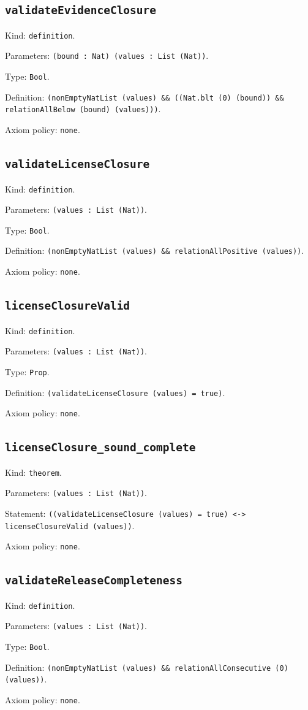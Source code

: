 \documentclass[11pt]{article}
\begin{document}
\subsection*{\texttt{validateEvidenceClosure}}
\noindent Kind: \texttt{definition}.\par
\noindent Parameters: \texttt{(bound : Nat) (values : List (Nat))}.\par
\noindent Type: \texttt{Bool}.\par
\noindent Definition: \texttt{(nonEmptyNatList (values) \&\& ((Nat.blt (0) (bound)) \&\& relationAllBelow (bound) (values)))}.\par
\noindent Axiom policy: \texttt{none}.\par
\subsection*{\texttt{validateLicenseClosure}}
\noindent Kind: \texttt{definition}.\par
\noindent Parameters: \texttt{(values : List (Nat))}.\par
\noindent Type: \texttt{Bool}.\par
\noindent Definition: \texttt{(nonEmptyNatList (values) \&\& relationAllPositive (values))}.\par
\noindent Axiom policy: \texttt{none}.\par
\subsection*{\texttt{licenseClosureValid}}
\noindent Kind: \texttt{definition}.\par
\noindent Parameters: \texttt{(values : List (Nat))}.\par
\noindent Type: \texttt{Prop}.\par
\noindent Definition: \texttt{(validateLicenseClosure (values) = true)}.\par
\noindent Axiom policy: \texttt{none}.\par
\subsection*{\texttt{licenseClosure\_sound\_complete}}
\noindent Kind: \texttt{theorem}.\par
\noindent Parameters: \texttt{(values : List (Nat))}.\par
\noindent Statement: \texttt{((validateLicenseClosure (values) = true) <-> licenseClosureValid (values))}.\par
\noindent Axiom policy: \texttt{none}.\par
\subsection*{\texttt{validateReleaseCompleteness}}
\noindent Kind: \texttt{definition}.\par
\noindent Parameters: \texttt{(values : List (Nat))}.\par
\noindent Type: \texttt{Bool}.\par
\noindent Definition: \texttt{(nonEmptyNatList (values) \&\& relationAllConsecutive (0) (values))}.\par
\noindent Axiom policy: \texttt{none}.\par
\end{document}
